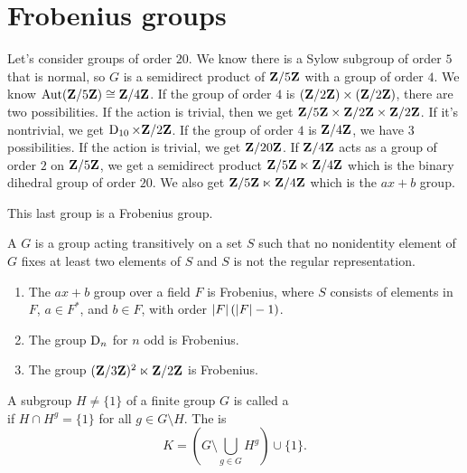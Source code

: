 \documentclass[11pt, oneside]{amsart}
\begin{document}
\section{Frobenius groups}
Let's consider groups of order $20$. We know there is a Sylow subgroup of order $5$ that is normal, so $G$ is a semidirect product of $\mathbf Z/5\mathbf Z$ with a group of order $4$. We know $\operatorname{Aut}(\mathbf Z/5\mathbf Z) \cong \mathbf Z/4\mathbf Z$. If the group of order $4$ is $(\mathbf Z / 2\mathbf Z)\times(\mathbf Z / 2\mathbf Z)$, there are two possibilities. If the action is trivial, then we get $\mathbf Z/5\mathbf Z \times \mathbf Z/2\mathbf Z \times \mathbf Z/2\mathbf Z$. If it's nontrivial, we get $\operatorname{D}_{10}\times\mathbf Z / 2\mathbf Z$. If the group of order $4$ is $\mathbf Z / 4\mathbf Z$, we have $3$ possibilities. If the action is trivial, we get $\mathbf Z / 20\mathbf Z$. If $\mathbf Z/4\mathbf Z$ acts as a group of order $2$ on $\mathbf Z / 5\mathbf Z$, we get a semidirect product $\mathbf Z/5\mathbf Z\ltimes \mathbf Z/4\mathbf Z$ which is the binary dihedral group of order $20$. We also get $\mathbf Z/5\mathbf Z\ltimes \mathbf Z/4\mathbf Z$ which is the $ax+b$ group.

This last group is a Frobenius group.
\begin{definition}
A  $G$ is a group acting transitively on a set $S$ such that no nonidentity element of $G$ fixes at least two elements of $S$ and $S$ is not the regular representation.
\end{definition}

\begin{example}\text{}
\begin{enumerate}
\item The $ax+b$ group over a field $F$ is Frobenius, where $S$ consists of elements in $F$, $a\in F^*$, and $b\in F$, with order $\left \lvert F \right \rvert (\left \lvert F \right \rvert - 1)$.
\item The group $\operatorname{D}_n$ for $n$ odd is Frobenius.
\item The group $(\mathbf Z/3\mathbf Z)^2 \ltimes \mathbf Z/2\mathbf Z$ is Frobenius.
\end{enumerate}
\end{example}

\begin{definition}
A subgroup $H\ne \{1\}$ of a finite group $G$ is called a   \\ if $H\cap H^g = \{1\}$ for all $g\in G\setminus H$. The  is
$$
K = \left(G \setminus \bigcup_{g\in G} H^g \right)\cup \{1\}.
$$
\end{definition}
\end{document}
